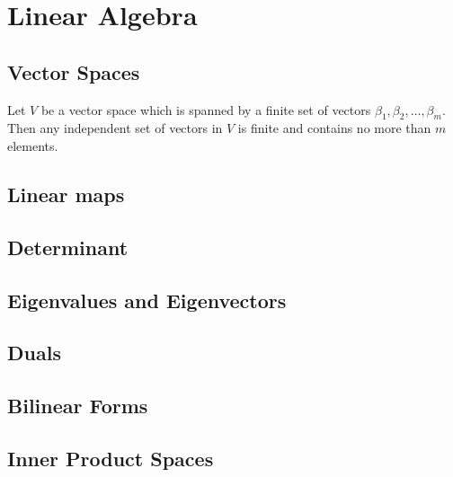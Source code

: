 \documentclass[main.tex]{subfiles}
\begin{document}
	\chapter{Linear Algebra}
		\section{Vector Spaces}
		\begin{theorem}
		Let $V$ be a vector space which is spanned by a finite set of vectors $\beta_1, \beta_2, \ldots, \beta_m$. Then any independent set of vectors in $V$ is finite and contains no more than $m$ elements.
		\end{theorem}

		\section{Linear maps}
		
		\section{Determinant}
		
		\section{Eigenvalues and Eigenvectors}
		
		\section{Duals}
		
		\section{Bilinear Forms}
		
		\section{Inner Product Spaces}
		
\end{document}
